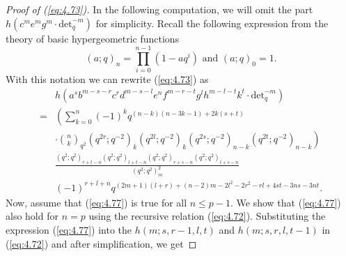 \documentclass[table,a4paper,reqno]{amsart}
\numberwithin{equation}{section}
\theoremstyle{definition}
\begin{document}
\begin{proof}[Proof of (\ref{eq:4.73})]
    In the following computation, we will omit the part $h\left(c^me^mg^m\cdot\text{det}_q^{-m}\right)$ for simplicity. Recall the following expression from the theory of basic hypergeometric functions
    \begin{equation}\label{eq:4.71+}
        (a;q)_n=\prod_{i=0}^{n-1}(1-aq^i) \text{ and }(a;q)_0=1.
    \end{equation}
    With this notation we can rewrite (\ref{eq:4.73}) as
    \begin{equation}\label{eq:4.77}
        \begin{split}
            &h\left(a^sb^{m-s-r}c^rd^{m-s-l}e^{n}f^{m-r-t}g^lh^{m-l-t}k^t\cdot\text{det}_q^{-m}\right)\\
            =&\left(\sum_{k=0}^{n}(-1)^{k}q^{(n-k)(n-3k-1)+2k(s+t)}\right.\\
            &\left.\cdot{n\choose k}_{q^{2}}(q^{2r};q^{-2})_k(q^{2l};q^{-2})_k(q^{2s};q^{-2})_{n-k}(q^{2t};q^{-2})_{n-k}\right)\\
            &\frac{(q^2;q^2)_{r+t-n}(q^2;q^2)_{l+t-n}(q^2;q^2)_{r+s-n}(q^2;q^2)_{l+s-n}}{(q^2;q^2)_m^2}\\
            &(-1)^{r+l+n}q^{(2m+1)(l+r)+(n-2)m-2l^2-2r^2-rl+4st-3ns-3nt}.
        \end{split}
    \end{equation}
    Now, assume that (\ref{eq:4.77}) is true for all $n\le p-1$. We show that (\ref{eq:4.77}) also hold for $n=p$ using the recursive relation (\ref{eq:4.72}). Substituting the expression (\ref{eq:4.77}) into the $h(m;s,r-1,l,t)$ and $h(m;s,r,l,t-1)$ in (\ref{eq:4.72}) and after simplification, we get

\end{proof}
\end{document}

